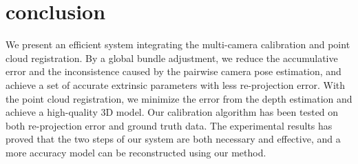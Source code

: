 \comments{}

\section{conclusion}
We present an efficient system integrating the multi-camera calibration and point cloud registration. By a global bundle adjustment, we reduce the accumulative error and the inconsistence caused by the pairwise camera pose estimation, and achieve a set of accurate extrinsic parameters with less re-projection error. With the point cloud registration, we minimize the error from the depth estimation and achieve a high-quality 3D model. Our calibration algorithm has been tested on both re-projection error and ground truth data. The experimental results has proved that the two steps of our system are both necessary and effective, and a more accuracy model can be reconstructed using our method.



